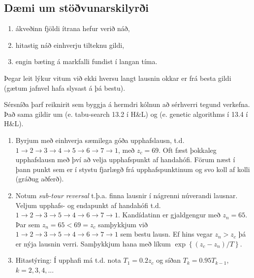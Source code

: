 \begin{samepage}
\subsection*{Dæmi um stöðvunarskilyrði}
\begin{enumerate}
  \item ákveðinn fjöldi ítrana hefur verið náð,
  \item hitastig náð einhverju tilteknu gildi,
  \item engin bæting á markfalli fundist í langan tíma.
\end{enumerate}
\end{samepage}

Þegar leit lýkur vitum við ekki hversu langt lausnin okkar er frá besta gildi (gætum jafnvel hafa slysast á þá bestu).

Sérsníða þarf reiknirit sem byggja á hermdri kólnun að sérhverri tegund verkefna. Það sama gildir um  (e. tabu-search 13.2 í H\&L) og  (e. genetic algorithms í 13.4 í H\&L).

\begin{lausn}\hspace{.1cm}
  \begin{enumerate}
    \item Byrjum með einhverja sæmilega góða upphafslausn, t.d. $1\to2\to3\to4\to5\to6\to7\to1$, með $z_c=69$.
      \subitem Oft fæst þokkaleg upphafslausn með því að velja upphafspunkt af handahófi. Förum næst í þann punkt sem er í stystu fjarlægð frá upphafspunktinum og svo koll af kolli (gráðug aðferð).
    \item Notum \emph{sub-tour reversal} t.þ.a. finna lausnir í nágrenni núverandi lausnar.
      \subitem Veljum upphafs- og endapunkt af handahófi t.d. $1\to2\to3\to5\to4\to6\to7\to1$. Kandídatinn er gjaldgengur með $z_n=65$. 	\subsubitem Þar sem $z_n=65<69=z_c$ samþykkjum við $1\to2\to3\to5\to4\to6\to7\to1$ sem bestu lausn.
      \subsubitem Ef hins vegar $z_n>z_c$ þá er nýja lausnin verri. Samþykkjum hana með líkum $\exp\left\{\left(z_c-z_n\right)/T\right\}$.
    \item Hitastýring: Í upphafi má t.d. nota $T_1=0.2z_c$ og síðan $T_k=0.95T_{k-1}$, $k=2,3,4,...$
  \end{enumerate}

\end{lausn}
